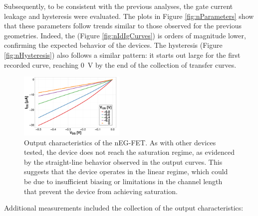 Subsequently, to be consistent with the previous analyses, the gate current leakage and hysteresis were evaluated. The plots in Figure \ref{fig:nParameters} show that these parameters follow trends similar to those observed for the previous geometries. Indeed, the \igs{} (Figure \ref{fig:nIdIgCurves}) is orders of magnitude lower, confirming the expected behavior of the devices. The hysteresis (Figure \ref{fig:nHysteresis}) also follows a similar pattern: it starts out large for the first recorded curve, reaching \SI{0}{\V} by the end of the collection of transfer curves.

\begin{figure}
    \centering
    \includegraphics[width = 0.45\textwidth]{figures/chapter3/nEGFET/nOutput.pdf}
    \caption{Output characteristics of the nEG-FET. As with other devices tested, the device does not reach the saturation regime, as evidenced by the straight-line behavior observed in the output curves. This suggests that the device operates in the linear regime, which could be due to insufficient biasing or limitations in the channel length that prevent the device from achieving saturation.}
    \label{fig:nOutput}
\end{figure}

Additional measurements included the collection of the output characteristics:

